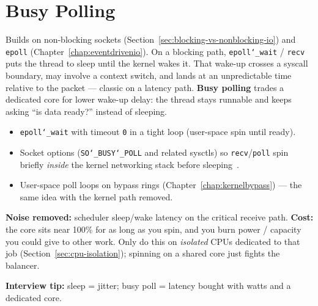 \section{Busy Polling}
\label{sec:busy-polling}
Builds on non-blocking sockets (Section~\ref{sec:blocking-vs-nonblocking-io}) and \texttt{epoll} 
(Chapter~\ref{chap:eventdrivenio}).
\newline
On a blocking path, \texttt{epoll\char`_wait} / \texttt{recv} puts the thread to sleep 
until the kernel wakes it. That wake-up crosses a syscall boundary, may involve a 
context switch, and lands at an unpredictable time relative to the packet --- 
classic  on a latency path.
\newline
\textbf{Busy polling} trades a dedicated core for lower wake-up delay: the thread 
stays runnable and keeps asking ``is data ready?'' instead of sleeping.
\begin{itemize}
    \item \texttt{epoll\char`_wait} with timeout \texttt{0} in a tight loop (user-space spin 
          until ready).
    \item Socket  options (\texttt{SO\char`_BUSY\char`_POLL} and related 
          sysctls) so \texttt{recv}/\texttt{poll} spin briefly \emph{inside} the kernel 
          networking stack before sleeping~\cite{man-busy-poll}.
    \item User-space poll loops on bypass rings (Chapter~\ref{chap:kernelbypass}) --- 
          the same idea with the kernel path removed.
\end{itemize}
\textbf{Noise removed:} scheduler sleep/wake latency on the critical receive path.
\newline
\textbf{Cost:} the core sits near 100\% for as long as you spin, and you burn power / 
capacity you could give to other work. Only do this on \emph{isolated} CPUs dedicated 
to that job (Section~\ref{sec:cpu-isolation}); spinning on a shared core just fights 
the balancer.
\par\noindent\textbf{Interview tip:} sleep = jitter; busy poll = latency bought with watts 
and a dedicated core.

